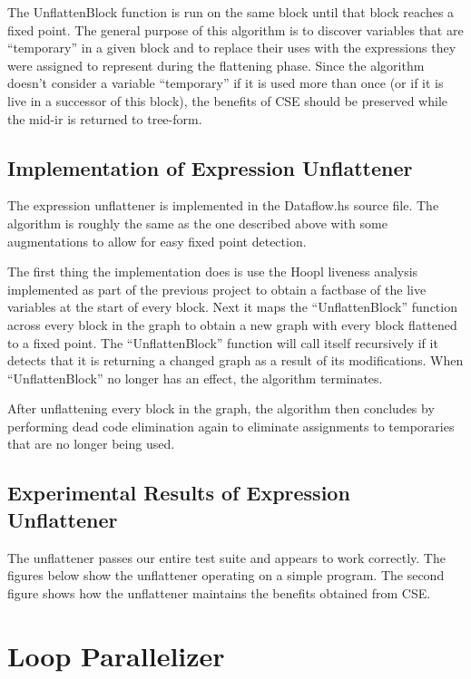 \documentclass[11pt]{article}
\begin{document}
\noindent The UnflattenBlock function is run on the same block until that block
reaches a fixed point. The general purpose of this algorithm is to
discover variables that are ``temporary'' in a given block and to replace
their uses with the expressions they were assigned to represent during
the flattening phase. Since the algorithm doesn't consider a variable
``temporary'' if it is used more than once (or if it is live in a
successor of this block), the benefits of CSE should be preserved
while the mid-ir is returned to tree-form. 

\subsection{Implementation of Expression Unflattener}

The expression unflattener is implemented in the Dataflow.hs source file. The algorithm is roughly the same as the one described above with some augmentations to allow for easy fixed point detection. 

The first thing the implementation does is use the Hoopl liveness analysis implemented as part of the previous project to obtain a factbase of the live variables at the start of every block. Next it maps the ``UnflattenBlock'' function across every block in the graph to obtain a new graph with every block flattened to a fixed point. The ``UnflattenBlock'' function will call itself recursively if it detects that it is returning a changed graph as a result of its modifications. When ``UnflattenBlock'' no longer has an effect, the algorithm terminates. 

After unflattening every block in the graph, the algorithm then concludes by performing dead code elimination again to eliminate assignments to temporaries that are no longer being used. 

\subsection{Experimental Results of Expression Unflattener}

The unflattener passes our entire test suite and appears to work
correctly. The figures below show the unflattener operating on a
simple program. The second figure shows how the unflattener maintains
the benefits obtained from CSE. 


\section{Loop Parallelizer}
\end{document}
